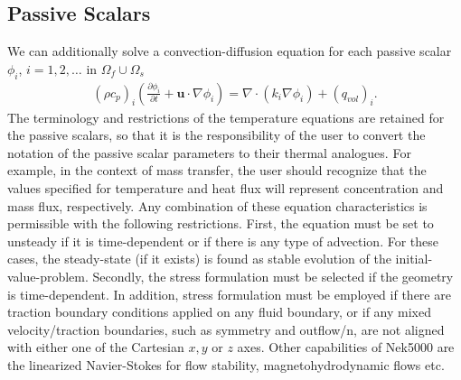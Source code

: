 \documentclass[letterpaper,10pt,english]{sphinxmanual}
\begin{document}
\subsection{Passive Scalars}
\label{\detokenize{theory:intro-pass-scal}}\label{\detokenize{theory:passive-scalars}}
We can additionally solve a convection-diffusion equation for each passive scalar \(\phi_i\),
\(i = 1,2,\ldots\) in \(\Omega_f \cup \Omega_s\)
\begin{equation}\label{equation:theory:pass_scal}
\begin{split}(\rho c_{p})_i \left( \frac{\partial \phi_{i}}{\partial t} + \mathbf u \cdot \nabla \phi_{i} \right) =
\nabla \cdot (k_i \nabla \phi_{i}) + (q_{vol})_i.\end{split}
\end{equation}
The terminology and restrictions of the temperature equations are retained for the passive scalars,
so that it is the responsibility of the user to convert the notation of the passive scalar
parameters to their thermal analogues.  For example, in the context of mass transfer, the user
should recognize that the values specified for temperature and heat flux will represent
concentration and mass flux, respectively.  Any combination of these equation characteristics is
permissible with the following restrictions. First, the equation must be set to unsteady if it is
time-dependent or if there is any type of advection. For these cases, the steady-state (if it
exists) is found as stable evolution of the initial-value-problem. Secondly, the stress formulation
must be selected if the geometry is time-dependent. In addition, stress formulation must be
employed if there are traction boundary conditions applied on any fluid boundary, or if any mixed
velocity/traction boundaries, such as symmetry and outflow/n, are not aligned with either one of
the Cartesian \(x,y\) or \(z\) axes.  Other capabilities of Nek5000 are the linearized
Navier-Stokes for flow stability, magnetohydrodynamic flows etc.
\end{document}
